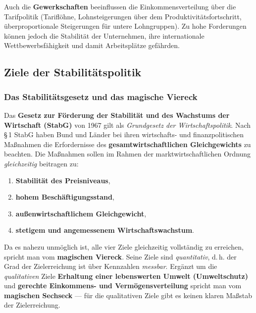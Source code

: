 \documentclass[11pt, a4paper]{article}
\begin{document}
Auch die \textbf{Gewerkschaften} beeinflussen die Einkommensverteilung über die
Tarifpolitik (Tariflöhne, Lohnsteigerungen über dem Produktivitätsfortschritt,
überproportionale Steigerungen für untere Lohngruppen). Zu hohe Forderungen können jedoch
die Stabilität der Unternehmen, ihre internationale Wettbewerbsfähigkeit und damit
Arbeitsplätze gefährden.

\subsection{Ziele der Stabilitätspolitik}

\subsubsection{Das Stabilitätsgesetz und das magische Viereck}

Das \textbf{Gesetz zur Förderung der Stabilität und des Wachstums der Wirtschaft (StabG)}
von 1967 gilt als \emph{Grundgesetz der Wirtschaftspolitik}. Nach \S\,1 StabG haben Bund
und Länder bei ihren wirtschafts- und finanzpolitischen Maßnahmen die Erfordernisse des
\textbf{gesamtwirtschaftlichen Gleichgewichts} zu beachten. Die Maßnahmen sollen im Rahmen
der marktwirtschaftlichen Ordnung \emph{gleichzeitig} beitragen zu:

\begin{enumerate}
  \item \textbf{Stabilität des Preisniveaus},
  \item \textbf{hohem Beschäftigungsstand},
  \item \textbf{außenwirtschaftlichem Gleichgewicht},
  \item \textbf{stetigem und angemessenem Wirtschaftswachstum}.
\end{enumerate}

Da es nahezu unmöglich ist, alle vier Ziele gleichzeitig vollständig zu erreichen, spricht
man vom \textbf{magischen Viereck}. Seine Ziele sind \emph{quantitativ}, d.\,h. der Grad
der Zielerreichung ist über Kennzahlen \emph{messbar}. Ergänzt um die \emph{qualitativen}
Ziele \textbf{Erhaltung einer lebenswerten Umwelt (Umweltschutz)} und \textbf{gerechte
Einkommens- und Vermögensverteilung} spricht man vom \textbf{magischen Sechseck} --- für
die qualitativen Ziele gibt es keinen klaren Maßstab der Zielerreichung.
\end{document}
